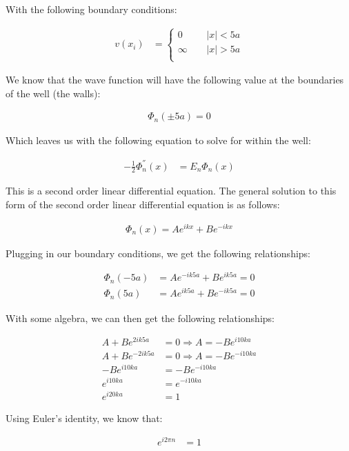 \documentclass[10pt, oneside, letterpaper]{article}
\begin{document}
With the following boundary conditions:

\begin{align*}
  v(x_i) &= \begin{cases}
          0       \quad \, & |x| < 5a \\
          \infty  \quad \, & |x| > 5a \\
     \end{cases}
\end{align*}

We know that the wave function will have the following value at the boundaries of the well (the walls):

\begin{align*}
  \Phi_n(\pm5a) = 0 
\end{align*}

Which leaves us with the following equation to solve for within the well:

\begin{align*}
  -\frac{1}{2}\Phi^{''}_n(x) &= {E_n}\Phi_n(x)
\end{align*}

This is a second order linear differential equation. The general solution to this form of the second order linear differential equation is as follows:

\begin{align*}
  \Phi_n(x) = Ae^{ikx} + Be^{-ikx}
\end{align*}

Plugging in our boundary conditions, we get the following relationships:

\begin{align*}
  \Phi_n(-5a) &= Ae^{-ik5a} + Be^{ik5a} = 0 \\
  \Phi_n(5a) &= Ae^{ik5a} + Be^{-ik5a} = 0
\end{align*}

With some algebra, we can then get the following relationships:

\begin{align*}
  A + Be^{2ik5a} &= 0 \Longrightarrow A = -Be^{i10ka} \\
  A + Be^{-2ik5a} &= 0 \Longrightarrow A = -Be^{-i10ka} \\
  -Be^{i10ka} &= -Be^{-i10ka} \\
  e^{i10ka} &= e^{-i10ka} \\
  e^{i20ka} &= 1
\end{align*}

Using Euler's identity, we know that:

\begin{align*}
  e^{i2\pi n} &= 1
\end{align*}
\end{document}
